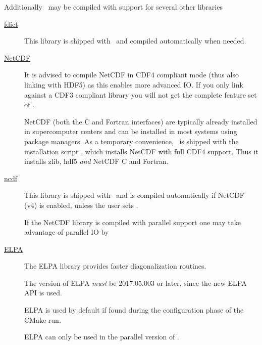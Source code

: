 Additionally \siesta\ may be compiled with support for several other
libraries
\begin{description}

  \item[\href{https://github.com/zerothi/fdict}{fdict}] %
  This library is shipped with \siesta\ and compiled automatically when needed.

  \item[\href{https://www.unidata.ucar.edu/software/netcdf}{NetCDF}] %
  It is advised to compile NetCDF in CDF4 compliant mode (thus
  also linking with HDF5) as this enables more advanced IO. If you
  only link against a CDF3 compliant library you will not get the
  complete feature set of \siesta.


NetCDF (both the C and Fortran interfaces)
are typically already installed in supercomputer centers and can be
installed in most systems using package managers.  As a temporary
convenience, \siesta\ is shipped with the installation script
, which installs NetCDF with full
CDF4 support. Thus it installs zlib, hdf5 \emph{and} NetCDF C and
Fortran.


  \item[\href{https://github.com/zerothi/ncdf}{ncdf}] %
  This library is shipped with \siesta\ and is compiled automatically
  if NetCDF (v4) is enabled, unless the user sets .

  If the NetCDF library is compiled with parallel support one may
  take advantage of parallel IO by 


  \item[\href{http://elpa.mpcdf.mpg.de}{ELPA}]%
  The ELPA\cite{ELPA,ELPA-1} library provides faster diagonalization routines.

  The version of ELPA \emph{must} be 2017.05.003 or later, since the
  new ELPA API is used.

  ELPA is used by default if found during the configuration phase of the CMake run.

  \note ELPA can only be used in the parallel version of \siesta.


\end{description}
